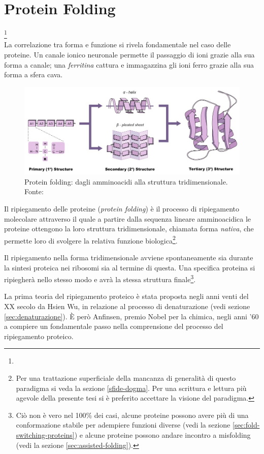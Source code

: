 \chapter{Protein Folding}
{
\footnote{}\\

La correlazione tra forma e funzione si rivela fondamentale nel caso delle proteine. Un canale ionico neuronale permette il passaggio di ioni grazie alla sua forma a canale; una \textit{ferritina} cattura e immagazzina gli ioni ferro grazie alla sua forma a sfera cava. 

\begin{figure}[htp]
	\centering
	\includegraphics[scale=0.5]{images/protein-folding_med.jpeg}
	\caption{Protein folding: dagli amminoacidi alla struttura tridimensionale. Fonte: \cite{proteinStrucBioNinja}}
	\label{fig:protein-folding-bioninja}
\end{figure}

\par Il ripiegamento delle proteine (\textit{protein folding}) è il processo di ripiegamento molecolare attraverso il quale a partire dalla sequenza lineare amminoacidica le proteine ottengono la loro struttura tridimensionale, chiamata forma \textit{nativa}, che permette loro di svolgere la relativa funzione biologica\footnote{Per una trattazione superficiale della mancanza di generalità di questo paradigma si veda la sezione \ref{sfide-dogma}. Per una scrittura e lettura più agevole della presente tesi si è preferito accettare la visione del paradigma.}. 

\par Il ripiegamento nella forma tridimensionale avviene spontaneamente sia durante la sintesi proteica nei ribosomi sia al termine di questa. Una specifica proteina si ripiegherà nello stesso modo e avrà la stessa struttura finale\footnote{Ciò non è vero nel 100\% dei casi, alcune proteine possono avere più di una conformazione stabile per adempiere funzioni diverse (vedi la sezione \ref{sec:fold-switching-proteins}) e alcune proteine possono andare incontro a misfolding (vedi la sezione \ref{sec:assisted-folding}).}.

\par La prima teoria del ripiegamento proteico è stata proposta negli anni venti del XX secolo da Hsien Wu\supercite{wu1931studies}, in relazione al processo di denaturazione (vedi sezione \ref{sec:denaturazione}). È però Anfinsen, premio Nobel per la chimica, negli anni '60 a compiere un fondamentale passo nella comprensione del processo del ripiegamento proteico\supercite{anfinsen1972formation}. 

}
